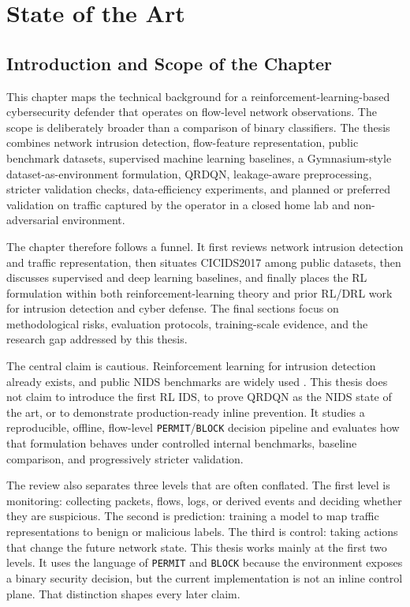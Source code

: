 \chapter{State of the Art}

\section{Introduction and Scope of the Chapter}

This chapter maps the technical background for a reinforcement-learning-based cybersecurity defender that operates on flow-level network observations. The scope is deliberately broader than a comparison of binary classifiers. The thesis combines network intrusion detection, flow-feature representation, public benchmark datasets, supervised machine learning baselines, a Gymnasium-style dataset-as-environment formulation, QRDQN, leakage-aware preprocessing, stricter validation checks, data-efficiency experiments, and planned or preferred validation on traffic captured by the operator in a closed home lab and non-adversarial environment.

The chapter therefore follows a funnel. It first reviews network intrusion detection and traffic representation, then situates CICIDS2017 among public datasets, then discusses supervised and deep learning baselines, and finally places the RL formulation within both reinforcement-learning theory and prior RL/DRL work for intrusion detection and cyber defense. The final sections focus on methodological risks, evaluation protocols, training-scale evidence, and the research gap addressed by this thesis.

The central claim is cautious. Reinforcement learning for intrusion detection already exists, and public NIDS benchmarks are widely used \parencite{Yang2024DRLNIDSSurvey,Kheddar2025RLIDSReview,Gueriani2024DRLIoTIDSSurvey}. This thesis does not claim to introduce the first RL IDS, to prove QRDQN as the NIDS state of the art, or to demonstrate production-ready inline prevention. It studies a reproducible, offline, flow-level \texttt{PERMIT}/\texttt{BLOCK} decision pipeline and evaluates how that formulation behaves under controlled internal benchmarks, baseline comparison, and progressively stricter validation.

The review also separates three levels that are often conflated. The first level is monitoring: collecting packets, flows, logs, or derived events and deciding whether they are suspicious. The second is prediction: training a model to map traffic representations to benign or malicious labels. The third is control: taking actions that change the future network state. This thesis works mainly at the first two levels. It uses the language of \texttt{PERMIT} and \texttt{BLOCK} because the environment exposes a binary security decision, but the current implementation is not an inline control plane. That distinction shapes every later claim.

